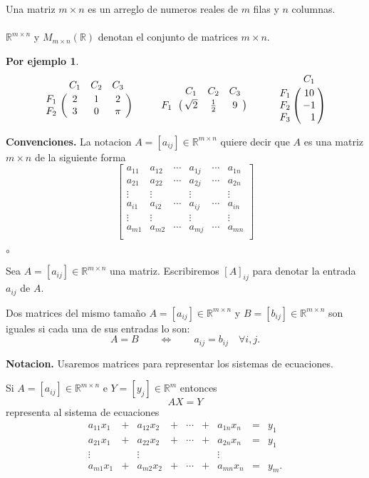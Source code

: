 \documentclass{article}
\theoremstyle{definition}
\theoremstyle{definition}
\newtheorem*{ej}{Por ejemplo}
\theoremstyle{remark}
\let\bbordermatrix\bordermatrix
\begin{document}
\begin{defi}
  Una matriz $m \times n$ es un arreglo de numeros reales de $m$ filas y $n$ columnas. \\\\
  $\mathbb{R}^{m \times n}$ y $M_{m \times n} (\mathbb{R})$ denotan el conjunto de matrices $m\times n$.
\end{defi}
\begin{ej}
  \[
    \bbordermatrix{~ & C_1 & C_2 & C_3 \cr
  F_{1} & 2 & 1 & 2 \cr
F_{2} & 3 & 0 & \pi \cr} 
\quad \quad \quad
\bbordermatrix{~ & C_1 & C_2 & C_3 \cr
F_{1} & \sqrt{2} & \frac{1}{2} & 9 \cr} 
\quad \quad \quad
\bbordermatrix{~ & C_1 \cr
F_{1} & 10 \cr
F_{2} & -1 \cr 
F_{3} & \phantom{-}1 \cr} 
  \]
  \end{ej}
  \textbf{Convenciones.} La notacion $A=[a_{ij}] \in \mathbb{R}^{m \times n}$ quiere decir que $A$ es una matriz $m \times n$ de la siguiente forma \[
\begin{bmatrix}
  a_{11} &   a_{12}   & \cdots & a_{1j} & \cdots & a_{1n}   \\ 
  a_{21} &   a_{22}   & \cdots & a_{2j} & \cdots & a_{2n}   \\ 
\vdots & \vdots &  & \vdots & & \vdots\\
a_{i1} & a_{i2} & \cdots & a_{ij} & \cdots & a_{in} \\
\vdots & \vdots & & \vdots &  & \vdots \\
  a_{m1} &   a_{m2}   & \cdots & a_{mj} & \cdots & a_{mn}   \\ 
\end{bmatrix}
  \]
\begin{list}{$\circ$}{}  
\item Sea $A = [a_{ij}] \in \mathbb{R}^{m \times n}$ una matriz. Escribiremos $[A]_{ij}$ para denotar la entrada $a_{ij}$ de $A$.

\item Dos matrices del mismo tamaño $A=[a_{ij}] \in \mathbb{R}^{m \times n}$ y $B=[b_{ij}] \in \mathbb{R}^{m \times n}$ son iguales si cada una de sus entradas lo son: \[
    A=B \quad \quad \Longleftrightarrow \quad \quad a_{ij} = b_{ij}\quad \forall i,j.
  \]
\end{list}
\textbf{Notacion.} Usaremos matrices para representar los sistemas de ecuaciones. \begin{defi}
  Si $A=[a_{ij}] \in \mathbb{R}^{m \times n}$ e $Y=[y_{j}] \in \mathbb{R}^m$ entonces \[
AX=Y
  \]
  representa al sistema de ecuaciones\[
\begin{matrix}
  a_{11}x_{1} & + & a_{12}x_{2} & + & \cdots & + & a_{1n}x_n & = & y_1 \\ 
  a_{21}x_{1} & + & a_{22}x_{2} & + & \cdots & + & a_{2n}x_n & = & y_1 \\
  \vdots & & \vdots  & & & & \vdots & & \\
  a_{m1}x_{1} & + & a_{m2}x_2 & + & \cdots & + & a_{mn}x_{n} & = & y_{m}.
\end{matrix}
  \]
\end{defi}
\end{document}
